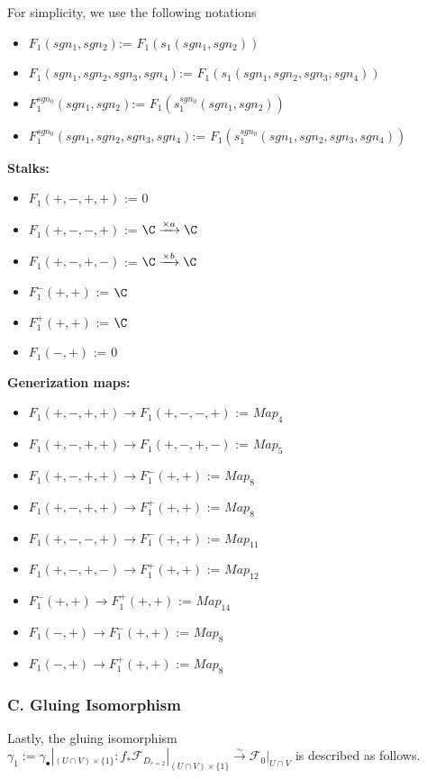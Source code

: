 For simplicity, we use the following notations
\begin{itemize}
\item $F_1(sgn_1,sgn_2)$:= $F_1(s_1(sgn_1,sgn_2))$
\item $F_1(sgn_1,sgn_2,sgn_3,sgn_4)$:= $F_1(s_1(sgn_1,sgn_2,sgn_3,sgn_4))$
\item $F_1^{sgn_0}(sgn_1,sgn_2)$:= $F_1(s_1^{sgn_0}(sgn_1,sgn_2))$
\item $F_1^{sgn_0}(sgn_1,sgn_2,sgn_3,sgn_4)$:= $F_1(s_1^{sgn_0}(sgn_1,sgn_2,sgn_3,sgn_4))$
\end{itemize}
\textbf{Stalks:}

\begin{itemize}
\item $F_1(+,-,+,+)$ := $0$
\item $F_1(+,-,-,+)$ := $\C \xrightarrow{\times a} \C $
\item $F_1(+,-,+,-)$ := $\C \xrightarrow{\times b} \C $
\item $F_1^-(+,+)$ := $\C$
\item $F_1^+(+,+)$ := $\C$
\item $F_1(-,+)$ := $0$
\end{itemize}
\textbf{Generization maps:}

\begin{itemize}
\item $F_1(+,-,+,+)\rightarrow F_1(+,-,-,+)$ := $Map_4$
\item $F_1(+,-,+,+)\rightarrow F_1(+,-,+,-)$ := $Map_5$
\item $F_1(+,-,+,+)\rightarrow F_1^-(+,+)$ := $Map_8$
\item $F_1(+,-,+,+)\rightarrow F_1^+(+,+)$ := $Map_8$
\item $F_1(+,-,-,+)\rightarrow F_1^-(+,+)$ := $Map_{11}$
\item $F_1(+,-,+,-)\rightarrow F_1^+(+,+)$ := $Map_{12}$
\item $F_1^-(+,+)\rightarrow F_1^+(+,+)$ := $Map_{14}$
\item $F_1(-,+)\rightarrow F_1^-(+,+)$ := $Map_8$
\item $F_1(-,+)\rightarrow F_1^+(+,+)$ := $Map_8$
\end{itemize}

\subsubsection{C. Gluing Isomorphism}
Lastly, the gluing isomorphism $\gamma_1 := \gamma_\bullet|_{(U\cap V)\times \{1\}}:  f_*\mathscr{F}_{D_{r=2}}|_{(U\cap V)\times \{1\}}\xrightarrow{\sim} \mathscr{F}_0|_{U\cap V}$ is described as follows.

